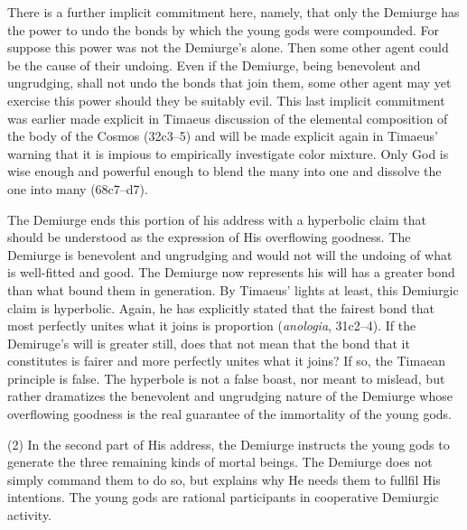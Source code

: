 There is a further implicit commitment here, namely, that only the Demiurge has the power to undo the bonds by which the young gods were compounded. For suppose this power was not the Demiurge's alone. Then some other agent could be the cause of their undoing. Even if the Demiurge, being benevolent and ungrudging, shall not undo the bonds that join them, some other agent may yet exercise this power should they be suitably evil. This last implicit commitment was earlier made explicit in Timaeus discussion of the elemental composition of the body of the Cosmos (32c3--5) and will be made explicit again in Timaeus' warning that it is impious to empirically investigate color mixture. Only God is wise enough and powerful enough to blend the many into one and dissolve the one into many (68c7–d7).

The Demiurge ends this portion of his address with a hyperbolic claim that should be understood as the expression of His overflowing goodness. The Demiurge is benevolent and ungrudging and would not will the undoing of what is well-fitted and good. The Demiurge now represents his will has a greater bond than what bound them in generation. By Timaeus' lights at least, this Demiurgic claim is hyperbolic. Again, he has explicitly stated that the fairest bond that most perfectly unites what it joins is proportion (\emph{anologia}, 31c2--4). If the Demiruge's will is greater still, does that not mean that the bond that it constitutes is fairer and more perfectly unites what it joins? If so, the Timaean principle is false. The hyperbole is not a false boast, nor meant to mislead, but rather dramatizes the benevolent and ungrudging nature of the Demiurge whose overflowing goodness is the real guarantee of the immortality of the young gods. 

(2) In the second part of His address, the Demiurge instructs the young gods to generate the three remaining kinds of mortal beings. The Demiurge does not simply command them to do so, but explains why He needs them to fullfil His intentions. The young gods are rational participants in cooperative Demiurgic activity.

